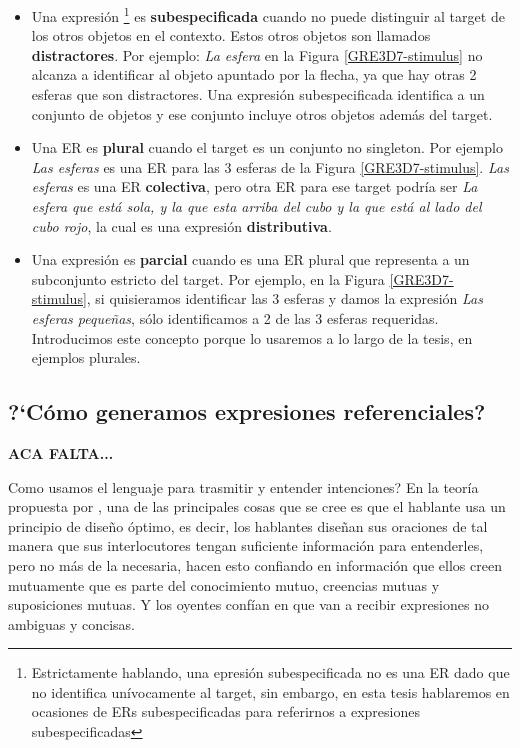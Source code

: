 \begin{itemize}
\item Una expresi\'on \footnote{Estrictamente hablando, una epresi\'on subespecificada no es una ER dado que no identifica un\'ivocamente al target, sin embargo, en esta tesis hablaremos en ocasiones de ERs subespecificadas para referirnos a expresiones subespecificadas} es {\bf subespecificada} cuando no puede distinguir al target de los otros objetos en el contexto. Estos otros objetos son llamados \textbf{distractores}. Por ejemplo: {\it La esfera} en la Figura \ref{GRE3D7-stimulus} no alcanza a identificar al objeto apuntado por la flecha, ya que hay otras 2 esferas que son distractores. Una expresi\'on subespecificada identifica a un conjunto de objetos y ese conjunto incluye otros objetos adem\'as del target.

\item Una ER es {\bf plural} cuando el target es un conjunto no singleton. Por ejemplo {\it Las esferas} es una ER para las 3 esferas de la Figura \ref{GRE3D7-stimulus}. {\it Las esferas} es una ER \textbf{colectiva}, pero otra ER para ese target podr\'ia ser {\it La esfera que est\'a sola, y la que esta arriba del cubo y la que est\'a al lado del cubo rojo}, la cual es una expresi\'on \textbf{distributiva}.

\item Una expresi\'on es {\bf parcial} cuando es una ER plural que representa a un subconjunto estricto del target. Por ejemplo, en la Figura \ref{GRE3D7-stimulus}, si quisieramos identificar las 3 esferas y damos la expresi\'on {\it Las esferas peque\~nas}, s\'olo identificamos a 2 de las 3 esferas requeridas. Introducimos este concepto porque lo usaremos a lo largo de la tesis, en ejemplos plurales. 
\end{itemize}

\subsection{?`C\'omo generamos expresiones referenciales?}
\label{sec:psicolinguistica}

\textbf{ACA FALTA...}

Como usamos el lenguaje para trasmitir y entender intenciones? En la teor\'ia propuesta por \cite{clark1992arenas}, \cite{Clark-Marshall81} una de las principales cosas que se cree es que el hablante usa un principio de dise\~no \'optimo, es decir, los hablantes dise\~nan sus oraciones de tal manera que sus interlocutores tengan suficiente informaci\'on para entenderles, pero no m\'as de la necesaria, hacen esto confiando en informaci\'on que ellos creen mutuamente que es parte del conocimiento mutuo, creencias mutuas y suposiciones mutuas. Y los oyentes conf\'ian en que van a recibir expresiones no ambiguas y concisas. 


